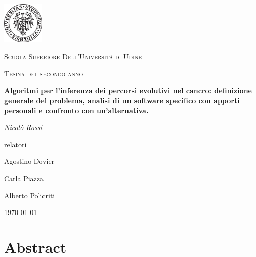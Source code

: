 \documentclass[a4paper]{article}
\begin{document}
		
	\begin{titlepage}
		\centering
		\begin{center}
        	\includegraphics[width=2cm]{./Images/pollo}
   		\end{center}
		{\scshape\LARGE Scuola Superiore Dell'Università di Udine\par}
		\vspace{1cm}
		{\scshape\Large Tesina del secondo anno \par}
		\vspace{1.5cm}
		{\huge\bfseries Algoritmi per l'inferenza dei percorsi evolutivi nel cancro:
				definizione generale del problema, analisi di un software specifico con apporti personali e confronto
				con un'alternativa.\par}
		\vspace{2cm}
		{\Large\itshape Nicolò Rossi\par}
		\vfill
		relatori\par
		{ \large Agostino Dovier \par \large Carla Piazza \par \large Alberto Policriti}
		\vfill
		
		{\large \today\par}
		
	\end{titlepage}
	
	\normalsize
	\tableofcontents{}
        \newpage
        
	\section{\LARGE Abstract}
	\normalsize
	
\end{document}
